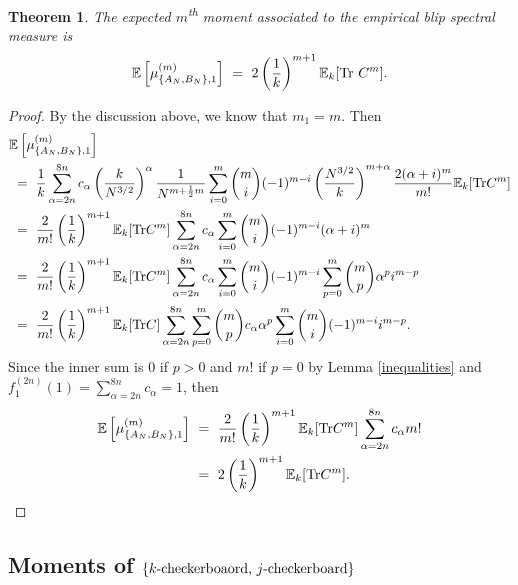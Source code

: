 \documentclass[11pt,reqno]{amsart}
\numberwithin{equation}{section}
\theoremstyle{plain}
\newtheorem{theorem}[thm]{Theorem}
\begin{document}
\begin{theorem}\label{GOE-checkerboard Moments}
The expected $m$\textsuperscript{th} moment associated to the empirical blip spectral measure is
\begin{align}
\mathbb{E}\left[\mu_{\{A_N,B_N\},1}^{(m)}\right] \ = \ 2\left(\frac{1}{k}\right)^{m+1}\mathbb{E}_k[\textup{Tr }C^m].
\end{align}
\end{theorem}
\begin{proof}
By the discussion above, we know that $m_1=m$. Then
\begin{align}
&\mathbb{E}\left[\mu_{\{A_N,B_N\},1}^{(m)}\right] \\
&\ = \ \frac{1}{k}\sum_{\alpha=2n}^{8n}c_\alpha\left(\frac{k}{N^{3/2}}\right)^\alpha\frac{1}{N^{m+\frac{1}{2}m}} \sum_{i=0}^m \binom{m}{i}(-1)^{m-i}\left(\frac{N^{3/2}}{k}\right)^{m+\alpha}\frac{2(\alpha+i)^m}{m!}\mathbb{E}_k[\textup{Tr}C^{m}] \nonumber \\
&\ = \ \frac{2}{m!}\left(\frac{1}{k}\right)^{m+1}\mathbb{E}_k[\textup{Tr}C^m]\sum_{\alpha=2n}^{8n}c_\alpha\sum_{i=0}^m \binom{m}{i}(-1)^{m-i}(\alpha+i)^m \nonumber \\
&\ = \ \frac{2}{m!}\left(\frac{1}{k}\right)^{m+1}\mathbb{E}_k[\textup{Tr}C^m] \sum_{\alpha=2n}^{8n}c_\alpha\sum_{i=0}^m \binom{m}{i}(-1)^{m-i}\sum_{p=0}^m \binom{m}{p}\alpha^{p}i^{m-p} \nonumber \\
&\ = \ \frac{2}{m!}\left(\frac{1}{k}\right)^{m+1}\mathbb{E}_k[\textup{Tr}C]\sum_{\alpha=2n}^{8n}\sum_{p=0}^m\binom{m}{p}c_\alpha\alpha^p\sum_{i=0}^m\binom{m}{i}(-1)^{m-i}i^{m-p}.\label{MomentCalc2}
\end{align}
Since the inner sum is 0 if $p>0$ and $m!$ if $p=0$ by Lemma \ref{inequalities} and $f_1^{(2n)}(1)=\sum_{\alpha=2n}^{8n}c_\alpha=1$, then
\begin{align}
\mathbb{E}\left[\mu_{\{A_N,B_N\},1}^{(m)}\right] &\ = \ \frac{2}{m!}\left(\frac{1}{k}\right)^{m+1}\mathbb{E}_k[\textup{Tr}C^m]\sum_{\alpha=2n}^{8n}c_\alpha m! \nonumber \\
&\ = \ 2\left(\frac{1}{k}\right)^{m+1}\mathbb{E}_k[\textup{Tr}C^m].
\end{align}
\end{proof}


\subsection{Moments of $\{k\textup{-checkerboaord, }j\textup{-checkerboard}\}$}
\end{document}

